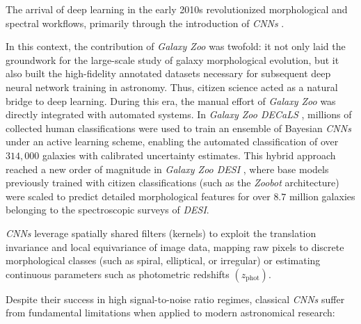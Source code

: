 The arrival of deep learning in the early 2010s revolutionized morphological and spectral workflows, primarily through the introduction of \textit{\glspl{CNN}} \autocites{ar:huertas-company-2015}{ar:dieleman-2015}{ar:dominguez-sanchez-2018}.

In this context, the contribution of \textit{Galaxy Zoo} was twofold: it not only laid the groundwork for the large-scale study of galaxy morphological evolution, but it also built the high-fidelity annotated datasets necessary for subsequent deep neural network training in astronomy. Thus, citizen science acted as a natural bridge to deep learning. During this era, the manual effort of \textit{Galaxy Zoo} was directly integrated with automated systems. In \textit{Galaxy Zoo DECaLS} \autocite{ar:walmsley-2022}, millions of collected human classifications were used to train an ensemble of Bayesian \textit{\glspl{CNN}} under an active learning scheme, enabling the automated classification of over $314,000$ galaxies with calibrated uncertainty estimates. This hybrid approach reached a new order of magnitude in \textit{Galaxy Zoo DESI} \autocite{ar:walmsley-2023}, where base models previously trained with citizen classifications (such as the \textit{Zoobot} architecture) were scaled to predict detailed morphological features for over $8.7$ million galaxies belonging to the spectroscopic surveys of \textit{\gls{DESI}}.

\textit{\glspl{CNN}} leverage spatially shared filters (kernels) to exploit the translation invariance and local equivariance of image data, mapping raw pixels to discrete morphological classes (such as spiral, elliptical, or irregular) or estimating continuous parameters such as photometric redshifts $\left(z_{\text{phot}}\right)$. 




Despite their success in high signal-to-noise ratio regimes, classical \textit{\glspl{CNN}} suffer from fundamental limitations when applied to modern astronomical research:

